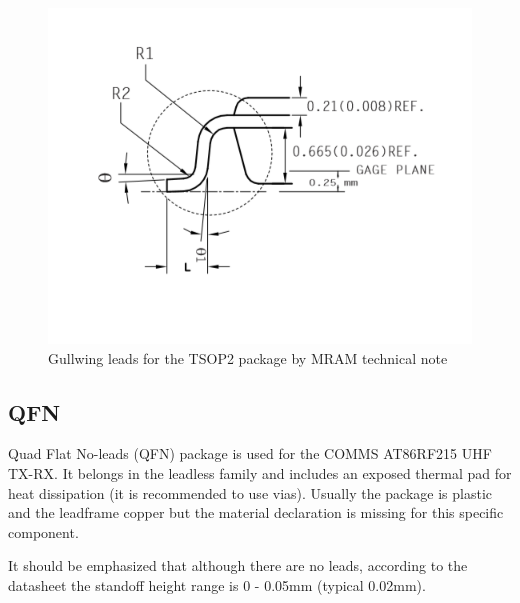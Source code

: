 \documentclass[final]{cubedoc}
\begin{document}
\begin{figure}[h!]
    \centering
    \includegraphics[height=0.3\textheight, width=\textwidth, keepaspectratio]{docs/gullwing_leads_TSOP.png}
    \caption{Gullwing leads for the TSOP2 package by MRAM technical note}
    \label{fig:my_label}
\end{figure}

\subsection{QFN}


Quad Flat No-leads (QFN) package is used for the COMMS AT86RF215 UHF TX-RX. It belongs in the leadless family and includes an exposed thermal pad for heat dissipation (it is recommended to use vias). Usually the package is plastic and the leadframe copper but the material declaration is missing for this specific component. 

It should be emphasized that although there are no leads, according to the datasheet the standoff height range is 0 - 0.05mm (typical 0.02mm).
\end{document}
